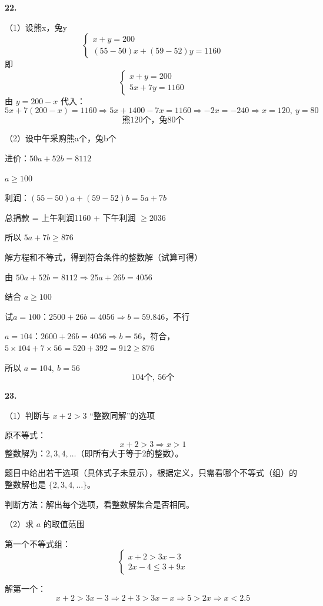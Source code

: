 \textbf{22.}

（1）设熊x，兔y
\[
\begin{cases}
x+y=200 \\
(55-50)x + (59-52)y = 1160
\end{cases}
\]
即
\[
\begin{cases}
x+y=200 \\
5x+7y=1160
\end{cases}
\]
由 \(y=200-x\) 代入：
\[
5x+7(200-x)=1160 \Rightarrow 5x+1400-7x=1160 \Rightarrow -2x=-240 \Rightarrow x=120,\ y=80
\]
\[
\boxed{\text{熊120个，兔80个}}
\]

（2）设中午采购熊a个，兔b个

进价：\(50a+52b=8112\)

\(a \ge 100\)

利润：\((55-50)a + (59-52)b = 5a+7b\)

总捐款 = 上午利润1160 + 下午利润 \(\ge 2036\)

所以 \(5a+7b \ge 876\)

解方程和不等式，得到符合条件的整数解（试算可得）

由 \(50a+52b=8112 \Rightarrow 25a+26b=4056\)

结合 \(a \ge 100\)

试\(a=100\)：\(2500+26b=4056 \Rightarrow b=59.846\)，不行

\(a=104\)：\(2600+26b=4056 \Rightarrow b=56\)，符合，\(5\times104+7\times56=520+392=912\ge876\)

所以 \(a=104,\ b=56\)
\[
\boxed{104\text{个},\ 56\text{个}}
\]

\bigskip

\textbf{23.}

（1）判断与 \(x+2>3\) “整数同解”的选项

原不等式：
\[
x+2>3 \Rightarrow x>1
\]
整数解为：\(2, 3, 4, \dots\)（即所有大于等于2的整数）。

题目中给出若干选项（具体式子未显示），根据定义，只需看哪个不等式（组）的整数解也是 \(\{2,3,4,\dots\}\)。

判断方法：解出每个选项，看整数解集合是否相同。

\bigskip

（2）求 \(a\) 的取值范围

第一个不等式组：
\[
\begin{cases}
x+2 > 3x-3 \\
2x-4 \leq 3+9x
\end{cases}
\]

解第一个：
\[
x+2 > 3x-3 \Rightarrow 2+3 > 3x-x \Rightarrow 5 > 2x \Rightarrow x < 2.5
\]

